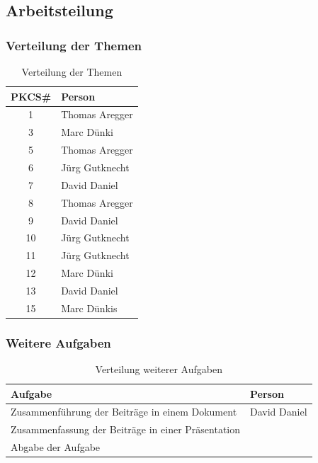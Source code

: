 \documentclass[10pt,a4paper]{article}
\begin{document}
\subsection{Arbeitsteilung}

\subsubsection{Verteilung der Themen}
\begin{table}[ht]
   \centering
   \begin{tabular}{|c|l|} \hline
      \textbf{PKCS\#} & \textbf{Person} \\\hline
      1 & Thomas Aregger \\\hline
      3 & Marc Dünki \\\hline
      5 & Thomas Aregger \\\hline
      6 & Jürg Gutknecht \\\hline
      7 & David Daniel \\\hline
      8 & Thomas Aregger \\\hline
      9 & David Daniel \\\hline
      10 & Jürg Gutknecht \\\hline
      11 & Jürg Gutknecht \\\hline
      12 & Marc Dünki \\\hline
      13 & David Daniel \\\hline
      15 & Marc Dünkis \\\hline
   \end{tabular}
   \caption{Verteilung der Themen}
   \label{tab:arbeitsteilung}
\end{table}

\FloatBarrier

\subsubsection{Weitere Aufgaben}
\begin{table}[ht]
   \centering
   \begin{tabular}{|p{7.8cm}|l|} \hline
      \textbf{Aufgabe} & \textbf{Person} \\\hline
      Zusammenführung der Beiträge in einem Dokument & David Daniel \\\hline
      Zusammenfassung der Beiträge in einer Präsentation & \\\hline
      Abgabe der Aufgabe & \\\hline
   \end{tabular}
   \caption{Verteilung weiterer Aufgaben}
   \label{tab:weitere-aufgaben}
\end{table}
\end{document}
